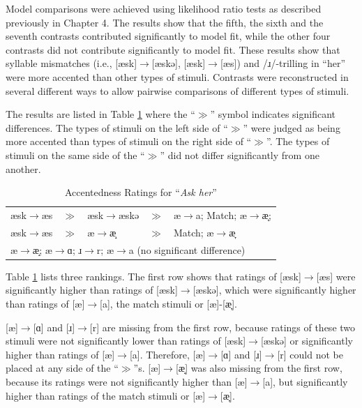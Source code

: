 Model comparisons were achieved using likelihood ratio tests as described previously in Chapter 4. The results show that the fifth, the sixth and the seventh contrasts contributed significantly to model fit, while the other four contrasts did not contribute significantly to model fit. These results show that syllable mismatches (i.e., [æsk]$\rightarrow$[æskə], [æsk]$\rightarrow$[æs]) and /ɹ/-trilling in “her” were more accented than other types of stimuli. Contrasts were reconstructed in several different ways to allow pairwise comparisons of different types of stimuli. 

The results are listed in Table \ref{table:ah2} where the “$\gg$” symbol indicates significant differences. The types of stimuli on the left side of “$\gg$” were judged as being more accented than types of stimuli on the right side of “$\gg$”. The types of stimuli on the same side of the “$\gg$” did not differ significantly from one another.

\begin{table}[!h]
  \figSpace
  \centering
  \caption{Accentedness Ratings for “\textit{Ask her}” }
  \label{table:ah2}%
    \begin{tabular}{lclcl}
    \toprule
 	æsk$\rightarrow$æs & $\gg$ & æsk$\rightarrow$æskə &$\gg$& æ$\rightarrow$a; Match; æ$\rightarrow$æ̞;\\
 	æsk$\rightarrow$æs & $\gg$ & æ$\rightarrow$æ̝ &$\gg$& Match; æ$\rightarrow$æ̞\\
 	\multicolumn{5}{l}{æ$\rightarrow$æ̝; æ$\rightarrow$ɑ; ɹ$\rightarrow$r; æ$\rightarrow$a (no significant difference)}\\
    \bottomrule
    \end{tabular}%
      \figSpace
\end{table}%

Table \ref{table:ah2} lists three rankings. The first row shows that ratings of [æsk]$\rightarrow$[æs] were significantly higher than ratings of [æsk]$\rightarrow$[æskə], which were significantly higher than ratings of [æ]$\rightarrow$[a], the match stimuli or [æ]-[æ̞]. 

 [æ]$\rightarrow$[ɑ] and [ɹ]$\rightarrow$[r] are missing from the first row, because ratings of these two stimuli were not significantly lower than ratings of [æsk]$\rightarrow$[æskə] or significantly higher than ratings of [æ]$\rightarrow$[a]. Therefore, [æ]$\rightarrow$[ɑ] and [ɹ]$\rightarrow$[r] could not be placed at any side of the “$\gg$”s. [æ]$\rightarrow$[æ̝] was also missing from the first row, because its ratings were not significantly higher than [æ]$\rightarrow$[a], but significantly higher than ratings of the match stimuli or [æ]$\rightarrow$[æ̞]. 

